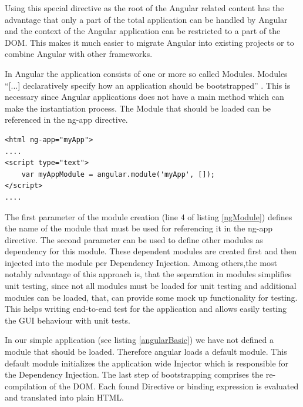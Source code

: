Using this special directive as the root of the Angular related content has the advantage that only a part of the total application can be handled by Angular and the context of the Angular application can be restricted to a part of the DOM.
This makes it much easier to migrate Angular into existing projects or to combine Angular with other frameworks.

In Angular the application consists of one or more so called Modules.
Modules \enquote{[...] declaratively specify how an application should be bootstrapped} \autocite{tech-ana:ng-module}.
This is necessary since Angular applications does not have a main method which can make the instantiation process.
The Module that should be loaded can be referenced in the ng-app directive.\\[5mm]

\begin{lstlisting}[label=ngModule,caption=ng-app declaration with module]
<html ng-app="myApp">
....
<script type="text">
	var myAppModule = angular.module('myApp', []);
</script>
....
\end{lstlisting}

The first parameter of the module creation (line 4 of listing \ref{ngModule}) defines the name of the module that must be used for referencing it in the ng-app directive.
The second parameter can be used to define other modules as dependency for this module.
These dependent modules are created first and then injected into the module per Dependency Injection.
Among others,the most notably advantage of this approach is, that the separation in modules simplifies unit testing, since not all modules must be loaded for unit testing and additional modules can be loaded, that, can provide some mock up functionality for testing.
This helps writing end-to-end test for the application and allows easily testing the GUI behaviour with unit tests. 

In our simple application (see listing \ref{angularBasic}) we have not defined a module that should be loaded. 
Therefore angular loads a default module.
This default module initializes the application wide Injector which is responsible for the Dependency Injection.
The last step of bootstrapping comprises the re-compilation of the DOM.
Each found Directive or binding expression is evaluated and translated into plain HTML.


